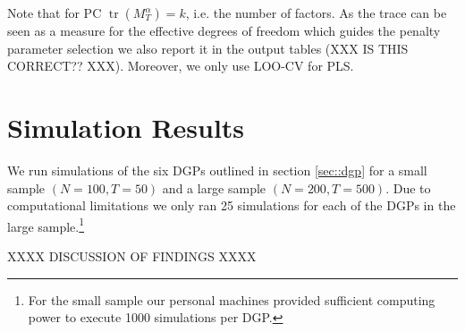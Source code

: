 Note that for PC $\operatorname{tr}\left(M_{T}^{\alpha}\right) = k$, i.e. the number of factors. As the trace can be seen as a measure for the effective degrees of freedom which guides the penalty parameter selection we also report it in the output tables (XXX IS THIS CORRECT?? XXX). Moreover, we only use LOO-CV for PLS.  


\section{Simulation Results}

We run simulations of the six DGPs outlined in section \ref{sec::dgp} for a small sample $(N = 100, T = 50)$ and a large sample $(N=200, T=500)$. Due to computational limitations we only ran 25 simulations for each of the DGPs in the large sample.\footnote{For the small sample our personal machines provided sufficient computing power to execute 1000 simulations per DGP.}

XXXX DISCUSSION OF FINDINGS XXXX





